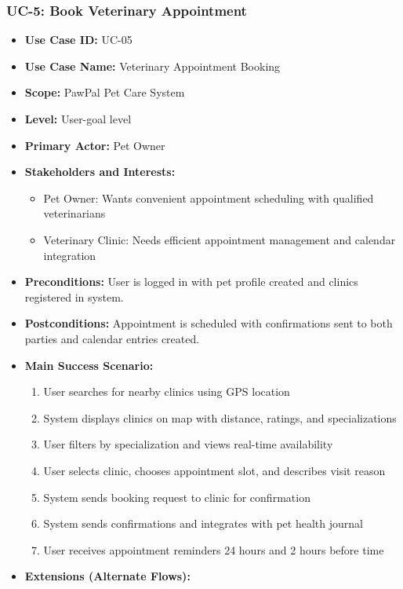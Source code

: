 \subsubsection*{UC-5: Book Veterinary Appointment}
\begin{itemize}
    \item \textbf{Use Case ID:} UC-05
    \item \textbf{Use Case Name:} Veterinary Appointment Booking
    \item \textbf{Scope:} PawPal Pet Care System
    \item \textbf{Level:} User-goal level
    \item \textbf{Primary Actor:} Pet Owner
    \item \textbf{Stakeholders and Interests:}
    \begin{itemize}
        \item Pet Owner: Wants convenient appointment scheduling with qualified veterinarians
        \item Veterinary Clinic: Needs efficient appointment management and calendar integration
    \end{itemize}
    \item \textbf{Preconditions:} User is logged in with pet profile created and clinics registered in system.
    \item \textbf{Postconditions:} Appointment is scheduled with confirmations sent to both parties and calendar entries created.
    \item \textbf{Main Success Scenario:}
    \begin{enumerate}
        \item User searches for nearby clinics using GPS location
        \item System displays clinics on map with distance, ratings, and specializations
        \item User filters by specialization and views real-time availability
        \item User selects clinic, chooses appointment slot, and describes visit reason
        \item System sends booking request to clinic for confirmation
        \item System sends confirmations and integrates with pet health journal
        \item User receives appointment reminders 24 hours and 2 hours before time
    \end{enumerate}
    \item \textbf{Extensions (Alternate Flows):}

\end{itemize}
